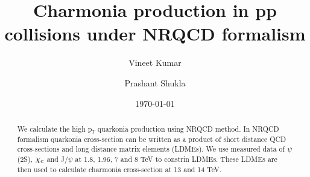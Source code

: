 \documentclass[aps,prc,preprint,superscriptaddress,showpacs,showkeys,amsmath]{revtex4-1}
\begin{document}
\newcommand{\Jpsi}{J/\psi}
\newcommand{\pT}{p_{T}}
\newcommand{\calO}{{\cal{O}}}
\newcommand{\barQ}{{\bar{Q}}}
\newcommand{\barq}{{\bar{q}}}
\newcommand{\barc}{{\bar{c}}}
\newcommand{\barb}{{\bar{b}}}
\newcommand{\baru}{\bar{u}}
\newcommand{\barv}{\bar{v}}
\newcommand{\barup}{\bar{u}_{+}}
\newcommand{\barum}{\bar{u}_{-}}
\newcommand{\barvp}{\bar{v}_{+}}
\newcommand{\barvm}{\bar{v}_{-}}
\newcommand{\charm}{{\rm{charm}}}
\newcommand{\bottom}{{\rm{bottom}}}

\newcommand{\cs}{{\hat{s}}}
\newcommand{\ct}{{\hat{t}}}
\newcommand{\cu}{{\hat{u}}}
\newcommand{\alphas}{{\alpha_{s}}}


\newcommand{\shat}{\hat{\rm s}}
\newcommand{\that}{\hat{\rm t}}
\newcommand{\uhat}{\hat{\rm u}}
\newcommand{\zhat}{\hat{\rm z}}

\newcommand{\CA}{{\cal A}}
\newcommand{\Qbar}{{\overline Q}}
\newcommand{\QQbaroctetgen}{{Q\Qbar[ ^{2S+1}L_J^{(8)}]}}
\newcommand{\QQbaroctetsingS}{{Q\Qbar[ ^1S_0^{(8)}]}}
\newcommand{\QQbaroctettripP}{{Q\Qbar[ ^3P_J^{(8)}]}}
\newcommand{\QQbaroctettripPone}{{Q\Qbar[ ^3P_1^{(8)}]}}

\def\QQbaroctettripS{Q\Qbar[ ^3S_1^{(8)}]}
\def\QQbaroctetPzero{Q\Qbar[ ^3P_0^{(8)}]}
\def\QQbaroctetPone{Q\Qbar[ ^3P_1^{(8)}]}
\def\QQbaroctetPtwo{Q\Qbar[ ^3P_2^{(8)}]}



\title{{\Large Charmonia production in pp collisions under NRQCD formalism}} 
\author{\large Vineet Kumar}
\author{\large Prashant Shukla}

\date{\today}

\begin{abstract}
  We calculate the high p$_{T}$ quarkonia production using NRQCD method. In NRQCD 
  formalism quarkonia cross-section can be written as a product of short distance 
  QCD cross-sections and long distance matrix elements (LDMEs). We use measured
  data of $\psi$(2S), $\chi_{\rm c}$ and J/$\psi$ at 1.8, 1.96, 7 and 8 TeV to 
  constrin LDMEs. These LDMEs are then used to calculate charmonia cross-section
  at 13 and 14 TeV.
\end{abstract}
\end{document}
